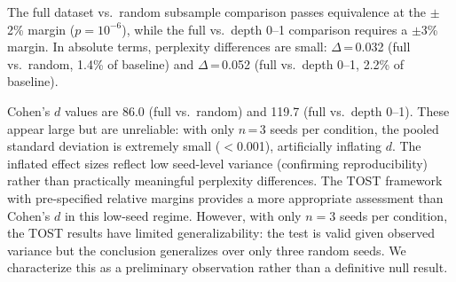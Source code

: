 The full dataset vs.\ random subsample comparison passes equivalence at the $\pm$2\% margin ($p = 10^{-6}$), while the full vs.\ depth 0--1 comparison requires a $\pm$3\% margin.
In absolute terms, perplexity differences are small: $\Delta$\,=\,0.032 (full vs.\ random, 1.4\% of baseline) and $\Delta$\,=\,0.052 (full vs.\ depth 0--1, 2.2\% of baseline).

Cohen's $d$ values are 86.0 (full vs.\ random) and 119.7 (full vs.\ depth 0--1).
These appear large but are unreliable: with only $n$\,=\,3 seeds per condition, the pooled standard deviation is extremely small ($<$0.001), artificially inflating $d$.
The inflated effect sizes reflect low seed-level variance (confirming reproducibility) rather than practically meaningful perplexity differences.
The TOST framework with pre-specified relative margins provides a more appropriate assessment than Cohen's $d$ in this low-seed regime.
However, with only $n{=}3$ seeds per condition, the TOST results have limited generalizability: the test is valid given observed variance but the conclusion generalizes over only three random seeds. We characterize this as a preliminary observation rather than a definitive null result.
